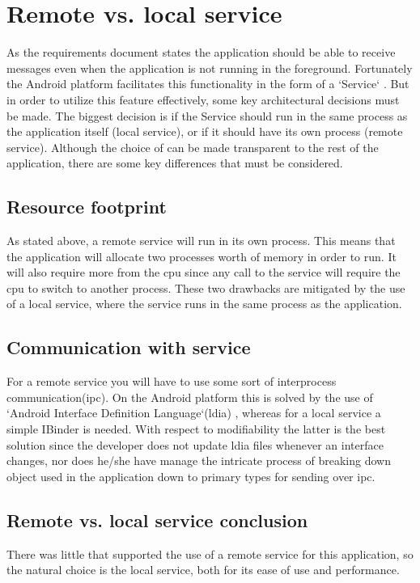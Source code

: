 

\section{Remote vs. local service}

As the requirements document states the application should be able to receive messages even when the application is not running in the foreground. Fortunately the Android platform facilitates this functionality in the form of a `Service` \cite{bib:service}. But in order to utilize this feature effectively, some key architectural decisions must be made. The biggest decision is if the Service should run in the same process as the application itself (local service), or if it should have its own process (remote service). Although the choice of can be made transparent to the rest of the application, there are some key differences that must be considered.

\newpage

\subsection{Resource footprint}
As stated above, a remote service will run in its own process. This means that the application will allocate two processes worth of memory in order to run. It will also require more from the \gls{cpu} since any call to the service will require the \gls{cpu} to switch to another process. These two drawbacks are mitigated by the use of a local service, where the service runs in the same process as the application. 

\subsection{Communication with service}
For a remote service you will have to use some sort of  interprocess communication(\gls{ipc}). On the Android platform this is solved by the use of `Android Interface Definition Language`(\gls{ldia}) \cite{bib:aidl}, whereas for a local service a simple IBinder \cite{bib:ibinder} is needed. With respect to modifiability the latter is the best solution since the developer does not update \gls{ldia} files whenever an interface changes, nor does he/she have manage the intricate process of breaking down object used in the application down to primary types for sending over \gls{ipc}.

\subsection{Remote vs. local service conclusion}
There was little that supported the use of a remote service for this application, so the natural choice is the local service, both for its ease of use and performance.




